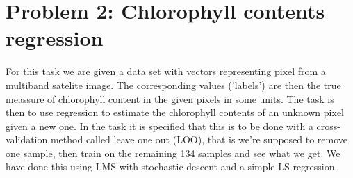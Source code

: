 \documentclass[12pt, a4paper]{article}
\begin{document}
\section{Problem 2: Chlorophyll contents regression}
For this task we are given a data set with vectors representing pixel from a multiband satelite image. The corresponding values ('labels') are then the true meassure of chlorophyll content in the given pixels in some units. The task is then to use regression to estimate the chlorophyll contents of an unknown pixel given a new one. In the task it is specified that this is to be done with a cross-validation method called leave one out (LOO), that is we're supposed to remove one sample, then train on the remaining 134 samples and see what we get. We have done this using LMS with stochastic descent and a simple LS regression.
\end{document}
